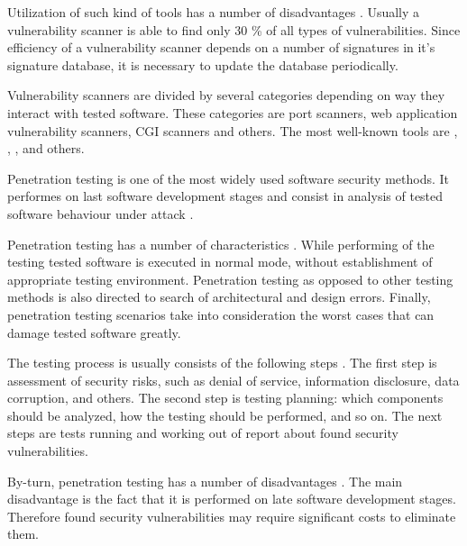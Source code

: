 %
Utilization of such kind of tools has a number of disadvantages . 
%
Usually a vulnerability scanner is able to find only 30 \% of all types of vulnerabilities. 
%
Since efficiency of a vulnerability scanner depends on a number of signatures in it's signature database, it is necessary to update the database  periodically. 

%
Vulnerability scanners are divided by several categories depending on way they interact with tested software. 
%
These categories are port scanners, web application vulnerability scanners, CGI scanners and others. 
%
The most well-known tools are  ,  ,  , and others. 



%
Penetration testing is one of the most widely used software security methods. 
%
It performes on last software development stages and consist in analysis of tested software behaviour under attack . 

%
Penetration testing has a number of characteristics . 
%
While performing of the testing tested software is executed in normal mode, without establishment of appropriate testing environment. 
%
Penetration testing as opposed to other testing methods is also directed to search of architectural and design errors. 
%
Finally, penetration testing scenarios take into consideration the worst cases that can damage tested software greatly. 

%
The testing process is usually consists of the following steps . 
%
The first step is assessment of security risks, such as denial of service, information disclosure, data corruption, and others. 
%
The second step is testing planning: which components should be analyzed, how the testing should be performed, and so on. 
%
The next steps are tests running and working out of report about found security vulnerabilities. 

%
By-turn, penetration testing has a number of disadvantages . 
%
The main disadvantage is the fact that it is performed on late software development stages. 
%
Therefore found security vulnerabilities may require significant costs to eliminate them. 